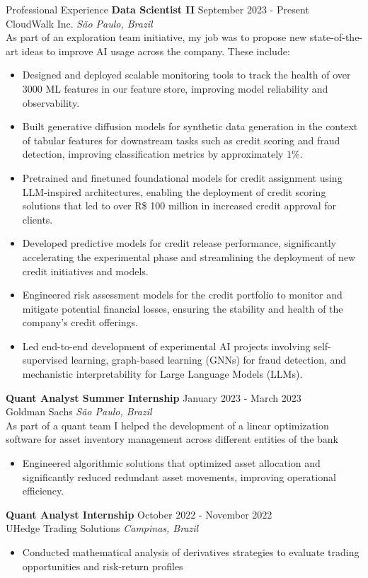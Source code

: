\documentclass[10pt]{resume}
\begin{document}
\begin{rSection}{Professional Experience}
\textbf{Data Scientist II} \hfill September 2023 - Present\\
CloudWalk Inc. \hfill \textit{São Paulo, Brazil} \\
\itemsep -3pt {}
As part of an exploration team initiative, my job was to propose new state-of-the-art ideas to improve AI usage across the company. These include:
\begin{itemize}
    \item Designed and deployed scalable monitoring tools to track the health of over 3000 ML features in our feature store, improving model reliability and observability.
    \item Built generative diffusion models for synthetic data generation in the context of tabular features for downstream tasks such as credit scoring and fraud detection, improving classification metrics by approximately $1\%$.
    \item Pretrained and finetuned foundational models for credit assignment using LLM-inspired architectures, enabling the deployment of credit scoring solutions that led to over R\$ 100 million in increased credit approval for clients.
    \item Developed predictive models for credit release performance, significantly accelerating the experimental phase and streamlining the deployment of new credit initiatives and models.
    \item Engineered risk assessment models for the credit portfolio to monitor and mitigate potential financial losses, ensuring the stability and health of the company's credit offerings.
    \item Led end-to-end development of experimental AI projects involving self-supervised learning, graph-based learning (GNNs) for fraud detection, and mechanistic interpretability for Large Language Models (LLMs).
\end{itemize}
\textbf{Quant Analyst Summer Internship} \hfill January 2023 - March 2023\\
Goldman Sachs \hfill \textit{São Paulo, Brazil} \\
\itemsep -3pt {}
As part of a quant team I helped the development of a linear optimization software for asset inventory management across different entities of the bank
 \begin{itemize}
    \item Engineered algorithmic solutions that optimized asset allocation and significantly reduced redundant asset movements, improving operational efficiency.
\end{itemize}

\textbf{Quant Analyst Internship} \hfill October 2022 - November 2022\\
UHedge Trading Solutions \hfill \textit{Campinas, Brazil}
\begin{itemize}
    \itemsep -3pt {}
    \item Conducted mathematical analysis of derivatives strategies to evaluate
    trading opportunities and risk-return profiles
\end{itemize}
\end{rSection}
\end{document}
